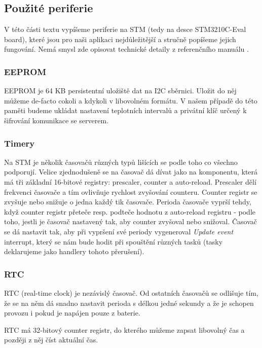 
\subsection{Použité periferie}
V této části textu vypíšeme periferie na STM (tedy na desce STM3210C-Eval board), které jsou
pro naši aplikaci nejdůležitější a stručně popíšeme jejich fungování.
Nemá smysl zde opisovat technické detaily z referenčního manuálu \citet{ReferenceManual}.

\subsubsection{EEPROM}
EEPROM je 64 KB persistentní uložiště dat na I2C sběrnici.
Uložit do něj můžeme de-facto cokoli a kdykoli v libovolném formátu.
V našem případě do této paměti budeme ukládat nastavení teplotních intervalů a privátní klíč
určený k šifrování komunikace se serverem.

\subsubsection{Timery}
Na STM je několik časovačů různých typů lišících se podle toho co všechno podporují.
Velice zjednodušeně se na časovač dá dívat jako na komponentu, která má tři základní
16-bitové registry: prescaler, counter a auto-reload.
Prescaler dělí frekvenci časovače a tím ovlivňuje rychlost zvyšování counteru.
Counter registr se zvyšuje nebo snižuje o jedna každý tik časovače.
Perioda časovače vyprší tehdy, když counter registr přeteče resp. podteče hodnotu
z auto-reload registru - podle toho, jestli je časovač nastavený tak, aby counter zvyšoval nebo snižoval.
Časovač se dá nastavit tak, aby při vypršení své periody vygeneroval \emph{Update event} interrupt,
který se nám bude hodit při spouštění různých tasků (tasky deklarujeme jako handlery tohoto přerušení).

\subsubsection{RTC}
RTC (real-time clock) je nezávislý časovač.
Od ostatních časovačů se odlišuje tím, že se na něm dá snadno nastavit perioda
s délkou jedné sekundy a že je schopen provozu i pokud je napájen pouze z
baterie.

RTC má 32-bitový counter registr, do kterého můžeme zapsat libovolný čas a později z
něj číst aktuální čas.

